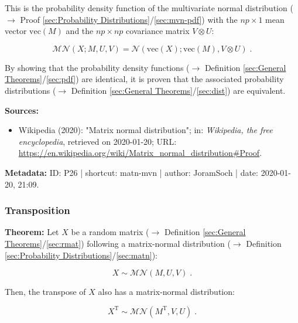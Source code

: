 \documentclass[a4paper,12pt,twoside]{book}
\begin{document}
This is the probability density function of the multivariate normal distribution ($\rightarrow$ Proof \ref{sec:Probability Distributions}/\ref{sec:mvn-pdf}) with the $np \times 1$ mean vector $\mathrm{vec}(M)$ and the $np \times np$ covariance matrix $V \otimes U$:

\begin{equation} \label{eq:matn-mvn-matn-mvn}
\mathcal{MN}(X; M, U, V) = \mathcal{N}(\mathrm{vec}(X); \mathrm{vec}(M), V \otimes U) \; .
\end{equation}

By showing that the probability density functions ($\rightarrow$ Definition \ref{sec:General Theorems}/\ref{sec:pdf}) are identical, it is proven that the associated probability distributions ($\rightarrow$ Definition \ref{sec:General Theorems}/\ref{sec:dist}) are equivalent.


\vspace{1em}
\textbf{Sources:}
\begin{itemize}
\item Wikipedia (2020): "Matrix normal distribution"; in: \textit{Wikipedia, the free encyclopedia}, retrieved on 2020-01-20; URL: \url{https://en.wikipedia.org/wiki/Matrix_normal_distribution#Proof}.
\end{itemize}


\vspace{1em}
\textbf{Metadata:} ID: P26 | shortcut: matn-mvn | author: JoramSoch | date: 2020-01-20, 21:09.
\vspace{1em}



\subsubsection[\textbf{Transposition}]{Transposition} \label{sec:matn-trans}
\setcounter{equation}{0}

\textbf{Theorem:} Let $X$ be a random matrix ($\rightarrow$ Definition \ref{sec:General Theorems}/\ref{sec:rmat}) following a matrix-normal distribution ($\rightarrow$ Definition \ref{sec:Probability Distributions}/\ref{sec:matn}):

\begin{equation} \label{eq:matn-trans-matn}
X \sim \mathcal{MN}(M, U, V) \; .
\end{equation}

Then, the transpose of $X$ also has a matrix-normal distribution:

\begin{equation} \label{eq:matn-trans-matn-trans}
X^\mathrm{T} \sim \mathcal{MN}(M^\mathrm{T}, V, U) \; .
\end{equation}
\end{document}
